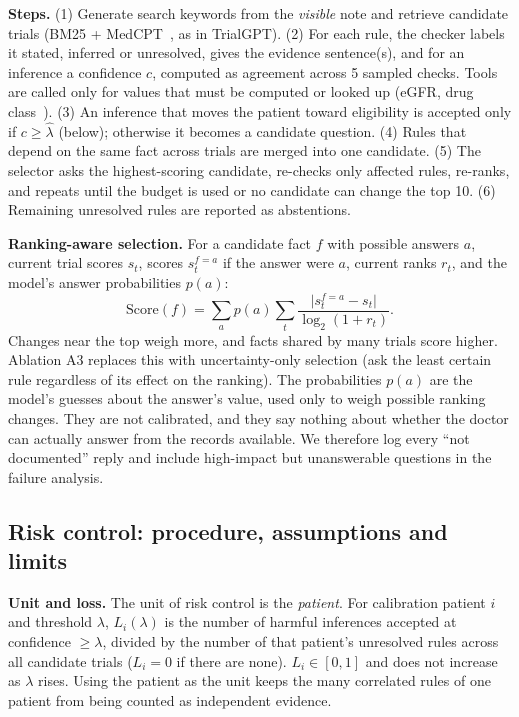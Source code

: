 \documentclass[10pt,a4paper]{article}
\begin{document}
\textbf{Steps.} (1) Generate search keywords from the \emph{visible} note and retrieve candidate trials (BM25 + MedCPT~\cite{medcpt}, as in TrialGPT). (2) For each rule, the checker labels it stated, inferred or unresolved, gives the evidence sentence(s), and for an inference a confidence \(c\), computed as agreement across 5 sampled checks. Tools are called only for values that must be computed or looked up (eGFR, drug class~\cite{rxnav}). (3) An inference that moves the patient toward eligibility is accepted only if \(c \ge \hat\lambda\) (below); otherwise it becomes a candidate question. (4) Rules that depend on the same fact across trials are merged into one candidate. (5) The selector asks the highest-scoring candidate, re-checks only affected rules, re-ranks, and repeats until the budget is used or no candidate can change the top 10. (6) Remaining unresolved rules are reported as abstentions.

\textbf{Ranking-aware selection.} For a candidate fact \(f\) with possible answers \(a\), current trial scores \(s_t\), scores \(s_t^{f=a}\) if the answer were \(a\), current ranks \(r_t\), and the model's answer probabilities \(p(a)\):
\begin{equation}\label{eq:sel}
\mathrm{Score}(f)=\sum_{a}p(a)\sum_{t}\frac{\lvert s_t^{f=a}-s_t\rvert}{\log_2(1+r_t)}.
\end{equation}
Changes near the top weigh more, and facts shared by many trials score higher. Ablation A3 replaces this with uncertainty-only selection (ask the least certain rule regardless of its effect on the ranking). The probabilities \(p(a)\) are the model's guesses about the answer's value, used only to weigh possible ranking changes. They are not calibrated, and they say nothing about whether the doctor can actually answer from the records available. We therefore log every ``not documented'' reply and include high-impact but unanswerable questions in the failure analysis.

\subsection{Risk control: procedure, assumptions and limits}
\textbf{Unit and loss.} The unit of risk control is the \emph{patient}. For calibration patient \(i\) and threshold \(\lambda\), \(L_i(\lambda)\) is the number of harmful inferences accepted at confidence \(\ge\lambda\), divided by the number of that patient's unresolved rules across all candidate trials (\(L_i=0\) if there are none). \(L_i\in[0,1]\) and does not increase as \(\lambda\) rises. Using the patient as the unit keeps the many correlated rules of one patient from being counted as independent evidence.
\end{document}
